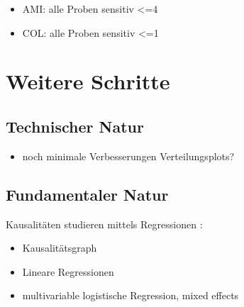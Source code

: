 \documentclass[
]{article}
\providecommand{\tightlist}{%
  \setlength{\itemsep}{0pt}\setlength{\parskip}{0pt}}
\begin{document}
\begin{itemize}
\tightlist
\item
  AMI: alle Proben sensitiv \textless=4
\item
  COL: alle Proben sensitiv \textless=1
\end{itemize}

\hypertarget{weitere-schritte}{%
\section{Weitere Schritte}\label{weitere-schritte}}

\hypertarget{technischer-natur}{%
\subsection{Technischer Natur}\label{technischer-natur}}

\begin{itemize}
\tightlist
\item
  noch minimale Verbesserungen Verteilungsplots?
\end{itemize}

\hypertarget{fundamentaler-natur}{%
\subsection{Fundamentaler Natur}\label{fundamentaler-natur}}

Kausalitäten studieren mittels Regressionen :

\begin{itemize}
\tightlist
\item
  Kausalitätsgraph
\item
  Lineare Regressionen
\item
  multivariable logistische Regression, mixed effects
\end{itemize}
\end{document}
